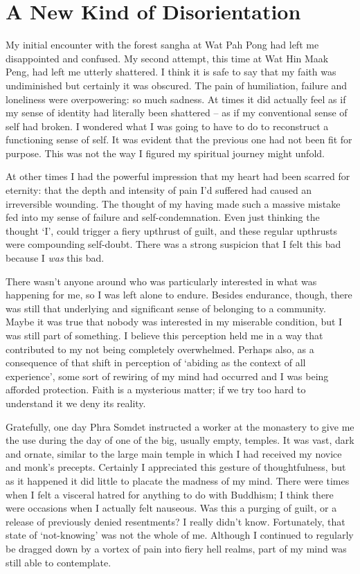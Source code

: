 \chapter{A New Kind of Disorientation}

My initial encounter with the forest sangha at Wat Pah Pong had left me
disappointed and confused. My second attempt, this time at Wat Hin Maak Peng, had left me utterly shattered. I think it is safe to say that my faith was undiminished but
certainly it was obscured. The pain of humiliation, failure and
loneliness were overpowering: so much sadness. At times it did actually
feel as if my sense of identity had literally been shattered -- as if my
conventional sense of self had broken. I wondered what I was going to
have to do to reconstruct a functioning sense of self. It was evident
that the previous one had not been fit for purpose. This was not the way
I figured my spiritual journey might unfold.

At other times I had the powerful impression that my heart had been
scarred for eternity: that the depth and intensity of pain I'd suffered
had caused an irreversible wounding. The thought of my having made such
a massive mistake fed into my sense of failure and self-condemnation.
Even just thinking the thought `I', could trigger a fiery upthrust of
guilt, and these regular upthrusts were compounding \mbox{self-doubt}. There
was a strong suspicion that I felt this bad because I \emph{was} this
bad.

There wasn't anyone around who was particularly interested in what was
happening for me, so I was left alone to endure. Besides endurance,
though, there was still that underlying and significant sense of
belonging to a community. Maybe it was true that nobody was interested
in my miserable condition, but I was still part of something. I believe
this perception held me in a way that contributed to my not being
completely overwhelmed. Perhaps also, as a consequence of that shift in
perception of `abiding as the context of all experience', some sort of
rewiring of my mind had occurred and I was being afforded protection.
Faith is a mysterious matter; if we try too hard to understand it we
deny its reality.

Gratefully, one day Phra Somdet instructed a worker at the monastery to
give me the use during the day of one of the big, usually empty,
temples. It was vast, dark and ornate, similar to the large main temple
in which I had received my novice and monk's precepts. Certainly I
appreciated this gesture of thoughtfulness, but as it happened it did
little to placate the madness of my mind. There were times when I felt a
visceral hatred for anything to do with Buddhism; I think there were
occasions when I actually felt nauseous. Was this a purging of guilt, or
a release of previously denied resentments? I really didn't know.
Fortunately, that state of `not-knowing' was not the whole of me.
Although I continued to regularly be dragged down by a vortex of pain
into fiery hell realms, part of my mind was still able to contemplate.

